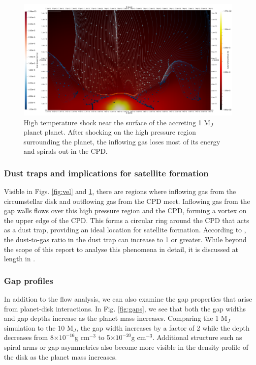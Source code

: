 \documentclass[preprint2]{aastex62}
\begin{document}
\renewcommand{\topfraction}{1}
\renewcommand{\bottomfraction}{1}

\begin{figure}[htb!]
	\centering
	\includegraphics[width=0.95\linewidth]{figures/Presentation/GasShock.png}
	\caption{\label{fig:tshock} High temperature shock near the surface of the accreting 1 M$_{J}$ planet planet. After shocking on the high pressure region surrounding the planet, the inflowing gas loses most of its energy and spirals out in the CPD.}
\end{figure}

\subsubsection{Dust traps and implications for satellite formation}

Visible in Figs.  \ref{fig:vel} and \ref{fig:tshock}, there are regions where inflowing gas from the circumstellar disk and outflowing gas from the CPD meet.
 Inflowing gas from the gap walls flows over this high pressure region and the CPD, forming a vortex on the upper edge of the CPD. This forms a circular ring around the CPD that acts as a dust trap, providing an ideal location for satellite formation.  According to \cite{satellite}, the dust-to-gas ratio in the dust trap can increase to 1 or greater. While beyond the scope of this report to analyse this phenomena in detail, it is discussed at length in \cite{satellite}.

\subsubsection{Gap profiles}

In addition to the flow analysis, we can also examine the gap properties that arise from planet-disk interactions. 
In Fig. \ref{fig:gaps}, we see that both the gap widths and gap depths increase as the planet mass increases. Comparing the 1 M$_{J}$ simulation to the 10 M$_{J}$, the gap width increases by a factor of 2 while the depth decreases from 8$\times10^{-16}$g cm$^{-3}$ to 5$\times10^{-20}$g cm$^{-3}$. Additional structure such as spiral arms or gap asymmetries also become more visible in the density profile of the disk as the planet mass increases. 
\end{document}

